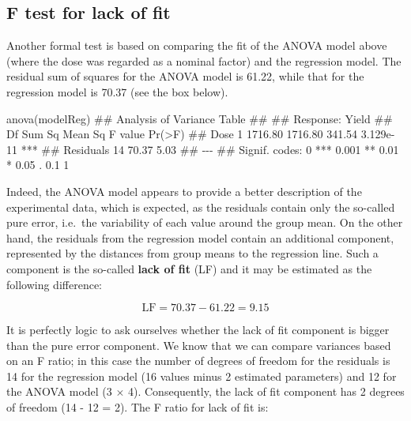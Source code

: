 \documentclass[a4paper,12pt,oneside]{book}
\newenvironment{Shaded}{\begin{snugshade}}{\end{snugshade}}
\newcommand{\DocumentationTok}[1]{#1}
\newcommand{\FunctionTok}[1]{#1}
\newcommand{\NormalTok}[1]{#1}
\begin{document}
\hypertarget{f-test-for-lack-of-fit}{%
\subsection{F test for lack of fit}\label{f-test-for-lack-of-fit}}

Another formal test is based on comparing the fit of the ANOVA model above (where the dose was regarded as a nominal factor) and the regression model. The residual sum of squares for the ANOVA model is 61.22, while that for the regression model is 70.37 (see the box below).

\begin{Shaded}
\begin{Highlighting}[]
\FunctionTok{anova}\NormalTok{(modelReg)}
\DocumentationTok{\#\# Analysis of Variance Table}
\DocumentationTok{\#\# }
\DocumentationTok{\#\# Response: Yield}
\DocumentationTok{\#\#           Df  Sum Sq Mean Sq F value    Pr(\textgreater{}F)    }
\DocumentationTok{\#\# Dose       1 1716.80 1716.80  341.54 3.129e{-}11 ***}
\DocumentationTok{\#\# Residuals 14   70.37    5.03                      }
\DocumentationTok{\#\# {-}{-}{-}}
\DocumentationTok{\#\# Signif. codes:  0 \textquotesingle{}***\textquotesingle{} 0.001 \textquotesingle{}**\textquotesingle{} 0.01 \textquotesingle{}*\textquotesingle{} 0.05 \textquotesingle{}.\textquotesingle{} 0.1 \textquotesingle{} \textquotesingle{} 1}
\end{Highlighting}
\end{Shaded}

Indeed, the ANOVA model appears to provide a better description of the experimental data, which is expected, as the residuals contain only the so-called pure error, i.e.~the variability of each value around the group mean. On the other hand, the residuals from the regression model contain an additional component, represented by the distances from group means to the regression line. Such a component is the so-called \textbf{lack of fit} (LF) and it may be estimated as the following difference:

\[\textrm{LF} = 70.37 - 61.22 = 9.15\]

It is perfectly logic to ask ourselves whether the lack of fit component is bigger than the pure error component. We know that we can compare variances based on an F ratio; in this case the number of degrees of freedom for the residuals is 14 for the regression model (16 values minus 2 estimated parameters) and 12 for the ANOVA model (3 \(\times\) 4). Consequently, the lack of fit component has 2 degrees of freedom (14 - 12 = 2). The F ratio for lack of fit is:
\end{document}
